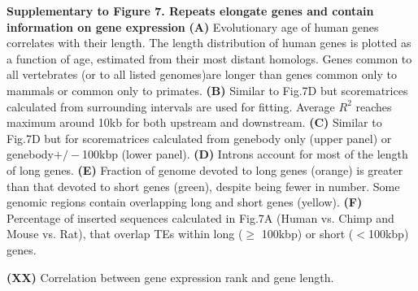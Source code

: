 \textbf{Supplementary to Figure 7. Repeats elongate genes and contain information on gene expression}
\textbf{(A)} Evolutionary age of human genes correlates with their length. The length distribution of human genes is plotted as a function of age, estimated from their most distant homologs. Genes common to all vertebrates (or to all listed genomes)are longer than genes common only to mammals or common only to primates.
\textbf{(B)} Similar to Fig.7D but scorematrices calculated from surrounding intervals are used for fitting. Average $R^2$ reaches maximum around 10kb for both upstream and downstream. 
\textbf{(C)} Similar to Fig.7D but for scorematrices calculated from genebody only (upper panel) or genebody$+/-$100kbp (lower panel).
\textbf{(D)} Introns account for most of the length of long genes. 
\textbf{(E)} Fraction of genome devoted to long genes (orange) is greater than that devoted to short genes (green), despite being fewer in number. Some genomic regions contain overlapping long and short genes (yellow).
\textbf{(F)} Percentage of inserted sequences calculated in Fig.7A (Human vs. Chimp and Mouse vs. Rat), that overlap TEs within long ($\geq$ 100kbp) or short ($<$100kbp) genes. 


\textbf{(XX)} Correlation between gene expression rank and gene length. 
